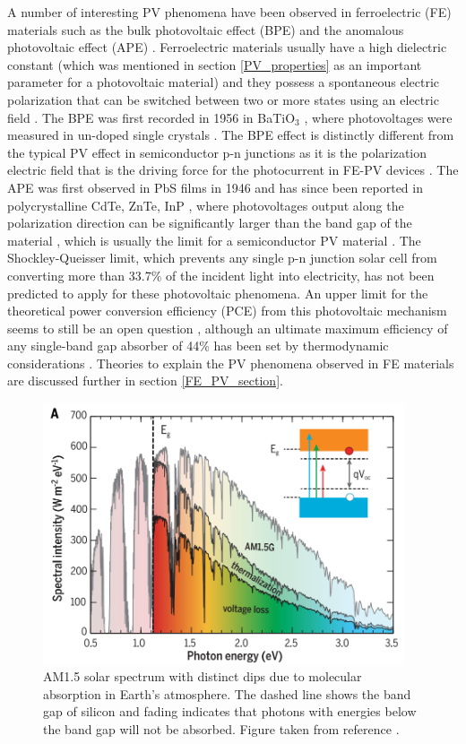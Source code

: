 A number of interesting PV phenomena have been observed in ferroelectric (FE) materials  such as the bulk photovoltaic effect (BPE) and the anomalous photovoltaic effect (APE) \cite{keith}. Ferroelectric materials usually have a high dielectric constant (which was mentioned in section \ref{PV_properties} as an important parameter for a photovoltaic material) and they possess a spontaneous electric polarization that can be switched between two or more states using an electric field \cite{new_FE_PV_1}.
The BPE was first recorded in 1956 in BaTiO$_3$ \cite{keith_46}, where photovoltages were measured in un-doped single crystals \cite{keith}.
The BPE effect is distinctly different from the typical PV effect in semiconductor
p-n junctions as it is the polarization electric field that is the driving force for the photocurrent in FE-PV devices \cite{FE_PV_rev1}. 
The APE was first observed in PbS films in 1946 \cite{keith_54} and has since been reported in polycrystalline CdTe, ZnTe, InP \cite{keith_55, keith_56, keith_57}, where photovoltages output along the polarization direction can be significantly larger than the band gap of the material \cite{FE_PV_rev1}, which is usually the limit for a semiconductor PV material \cite{keith}. 
The Shockley-Queisser limit, which prevents any single p-n junction solar cell from converting more than 33.7\% of the incident light into electricity, has not been predicted to apply for these photovoltaic phenomena. An upper limit for the theoretical power conversion efficiency (PCE) from this photovoltaic mechanism seems to still be an open question \cite{new_FE_PV}, although an ultimate maximum efficiency of any single-band gap absorber of 44\% has been set by thermodynamic considerations \cite{SQ_1961}. Theories to explain the PV phenomena observed in FE materials are discussed further in section \ref{FE_PV_section}.\\

\begin{figure}[h!]
  \centering
    \includegraphics[width=0.95\textwidth]{figures/solar_spectrum2.png}
    \caption{AM1.5 solar spectrum with distinct dips due to molecular absorption in Earth’s atmosphere. The dashed line shows the band gap of silicon and fading indicates that photons with energies below the band gap will not be absorbed. Figure taken from reference .}
  \label{solar_spectrum}
\end{figure}


